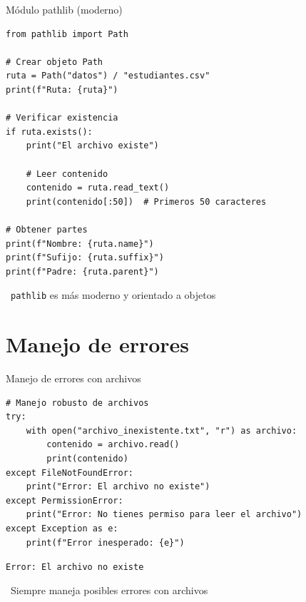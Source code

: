 \documentclass{beamer}
\begin{document}
\begin{frame}[fragile]{Módulo pathlib (moderno) \faFileCode}
\begin{lstlisting}
from pathlib import Path

# Crear objeto Path
ruta = Path("datos") / "estudiantes.csv"
print(f"Ruta: {ruta}")

# Verificar existencia
if ruta.exists():
    print("El archivo existe")
    
    # Leer contenido
    contenido = ruta.read_text()
    print(contenido[:50])  # Primeros 50 caracteres

# Obtener partes
print(f"Nombre: {ruta.name}")
print(f"Sufijo: {ruta.suffix}")
print(f"Padre: {ruta.parent}")
\end{lstlisting}

\vspace{-0.1cm}
\begin{notebox}
\small\faInfoCircle\ \texttt{pathlib} es más moderno y orientado a objetos
\end{notebox}
\end{frame}

\section{Manejo de errores}

\begin{frame}[fragile]{Manejo de errores con archivos \faExclamationTriangle}
\begin{lstlisting}
# Manejo robusto de archivos
try:
    with open("archivo_inexistente.txt", "r") as archivo:
        contenido = archivo.read()
        print(contenido)
except FileNotFoundError:
    print("Error: El archivo no existe")
except PermissionError:
    print("Error: No tienes permiso para leer el archivo")
except Exception as e:
    print(f"Error inesperado: {e}")
\end{lstlisting}

\vspace{-0.2cm}
\begin{tcolorbox}[colback=red!10,colframe=red,title={\small\faExclamationTriangle \ Salida},coltitle=fg0,left=3pt,right=3pt,top=2pt,bottom=2pt,boxsep=1pt]
\small\texttt{Error: El archivo no existe}
\end{tcolorbox}

\vspace{-0.1cm}
\begin{notebox}
\small\faShieldAlt\ Siempre maneja posibles errores con archivos
\end{notebox}
\end{frame}
\end{document}
